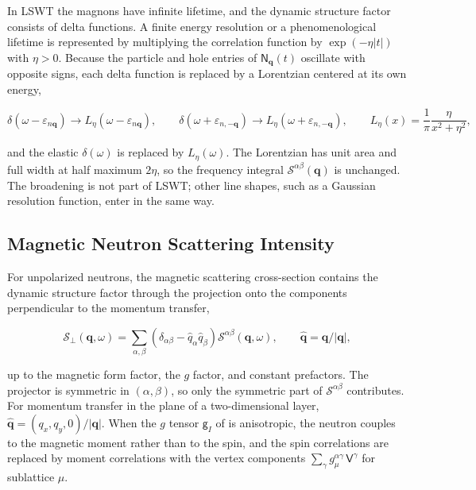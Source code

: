 In LSWT the magnons have infinite lifetime, and the dynamic structure factor consists of delta functions. A finite energy resolution or a phenomenological lifetime is represented by multiplying the correlation function by \(\exp(-\eta|t|)\) with \(\eta>0\). Because the particle and hole entries of \(\mathsf N_{\mathbf q}(t)\) oscillate with opposite signs, each delta function is replaced by a Lorentzian centered at its own energy,

\begin{equation}\label{eq-lswt-lorentzian-broadening}
\delta(\omega-\varepsilon_{n\mathbf q})\to L_\eta(\omega-\varepsilon_{n\mathbf q}),
\qquad
\delta(\omega+\varepsilon_{n,-\mathbf q})\to L_\eta(\omega+\varepsilon_{n,-\mathbf q}),
\qquad
L_\eta(x)=\frac{1}{\pi}\frac{\eta}{x^2+\eta^2},
\end{equation}

and the elastic \(\delta(\omega)\) is replaced by \(L_\eta(\omega)\). The Lorentzian has unit area and full width at half maximum \(2\eta\), so the frequency integral \(\mathcal S^{\alpha\beta}(\mathbf q)\) is unchanged. The broadening is not part of LSWT; other line shapes, such as a Gaussian resolution function, enter in the same way.

\subsection{Magnetic Neutron Scattering Intensity}

For unpolarized neutrons, the magnetic scattering cross-section contains the dynamic structure factor through the projection onto the components perpendicular to the momentum transfer,

\begin{equation}\label{eq-lswt-neutron-projection}
\mathcal S_\perp(\mathbf q,\omega)
=\sum_{\alpha,\beta}\left(\delta_{\alpha\beta}-\hat q_\alpha\hat q_\beta\right)\mathcal S^{\alpha\beta}(\mathbf q,\omega),
\qquad
\hat{\mathbf q}=\mathbf q/|\mathbf q|,
\end{equation}

up to the magnetic form factor, the \(g\) factor, and constant prefactors. The projector is symmetric in \((\alpha,\beta)\), so only the symmetric part of \(\mathcal S^{\alpha\beta}\) contributes. For momentum transfer in the plane of a two-dimensional layer, \(\hat{\mathbf q}=(q_x,q_y,0)/|\mathbf q|\). When the \(g\) tensor \(\mathsf g_I\) of  is anisotropic, the neutron couples to the magnetic moment rather than to the spin, and the spin correlations are replaced by moment correlations with the vertex components \(\sum_\gamma g_\mu^{\alpha\gamma}\,\mathsf V^\gamma\) for sublattice \(\mu\).

